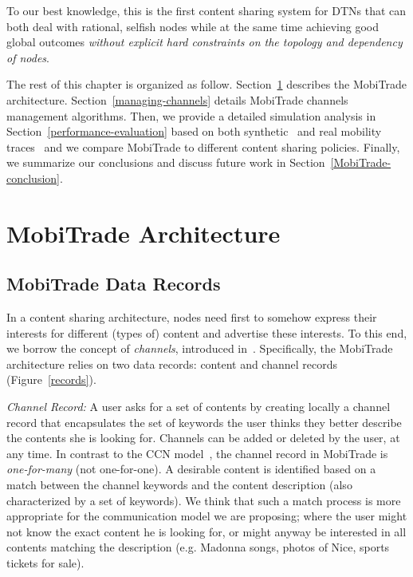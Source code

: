 To our best knowledge, this is the first content sharing system for DTNs that can both deal with rational, selfish nodes while at the same time achieving good global outcomes \emph{without explicit hard constraints on the topology and dependency of nodes}. 

The rest of this chapter is organized as follow. Section~\ref{MobiTrade-architecture} describes the MobiTrade architecture. Section~\ref{managing-channels} details MobiTrade channels management algorithms. Then, we provide a detailed simulation analysis in Section~\ref{performance-evaluation} based on both synthetic~\cite{HCMM} and real mobility traces~\cite{KAIST} and we compare MobiTrade to different content sharing policies. Finally, we summarize our conclusions and discuss future work in Section~\ref{MobiTrade-conclusion}.

\section{MobiTrade Architecture}
\label{MobiTrade-architecture}
\subsection{MobiTrade Data Records}
\label{content-channel-records}

In a content sharing architecture, nodes need first to somehow express their interests for different (types of) content and advertise these interests. To this end, we borrow the concept of \emph{channels}, introduced in~\cite{May07wirelessopportunistic}. Specifically, the MobiTrade architecture relies on two data records: content and channel records (Figure~\ref{records}).

\emph{Channel Record:} A user asks for a set of contents by creating locally a channel record that encapsulates the set of keywords the user thinks they better describe the contents she is looking for. Channels can be added or deleted by the user, at any time. In contrast to the CCN model~\cite{CCN}, the channel record in MobiTrade is \emph{one-for-many} (not one-for-one). A desirable content is identified based on a match between the channel keywords and the content description (also characterized by a set of keywords). We think that such a match process is more appropriate for the communication model we are proposing; where the user might not know the exact content he is looking for, or might anyway be interested in all contents matching the description (e.g. Madonna songs, photos of Nice, sports tickets for sale). 

